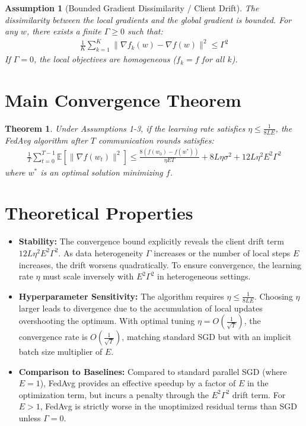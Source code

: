 \documentclass{article}
\newtheorem{theorem}{Theorem}
\newtheorem{assumption}{Assumption}
\begin{document}
\begin{assumption}[Bounded Gradient Dissimilarity / Client Drift]
The dissimilarity between the local gradients and the global gradient is bounded. For any $w$, there exists a finite $\Gamma \geq 0$ such that:
\begin{align*}
\frac{1}{K} \sum_{k=1}^K \|\nabla f_k(w) - \nabla f(w)\|^2 \leq \Gamma^2
\end{align*}
If $\Gamma = 0$, the local objectives are homogeneous ($f_k = f$ for all $k$).
\end{assumption}

\section*{Main Convergence Theorem}
\begin{theorem}
Under Assumptions 1-3, if the learning rate satisfies $\eta \leq \frac{1}{8 L E}$, the FedAvg algorithm after $T$ communication rounds satisfies:
\begin{align*}
\frac{1}{T} \sum_{t=0}^{T-1} \mathbb{E}[\|\nabla f(w_t)\|^2] \leq \frac{8(f(w_0) - f(w^*))}{\eta E T} + 8 L \eta \sigma^2 + 12 L \eta^2 E^2 \Gamma^2
\end{align*}
where $w^*$ is an optimal solution minimizing $f$.
\end{theorem}

\section*{Theoretical Properties}
\begin{itemize}
\item \textbf{Stability:} The convergence bound explicitly reveals the client drift term $12 L \eta^2 E^2 \Gamma^2$. As data heterogeneity $\Gamma$ increases or the number of local steps $E$ increases, the drift worsens quadratically. To ensure convergence, the learning rate $\eta$ must scale inversely with $E^2 \Gamma^2$ in heterogeneous settings.
\item \textbf{Hyperparameter Sensitivity:} The algorithm requires $\eta \leq \frac{1}{8 L E}$. Choosing $\eta$ larger leads to divergence due to the accumulation of local updates overshooting the optimum. With optimal tuning $\eta = O(\frac{1}{\sqrt{T}})$, the convergence rate is $O(\frac{1}{\sqrt{T}})$, matching standard SGD but with an implicit batch size multiplier of $E$.
\item \textbf{Comparison to Baselines:} Compared to standard parallel SGD (where $E=1$), FedAvg provides an effective speedup by a factor of $E$ in the optimization term, but incurs a penalty through the $E^2 \Gamma^2$ drift term. For $E>1$, FedAvg is strictly worse in the unoptimized residual terms than SGD unless $\Gamma=0$.
\end{itemize}
\end{document}
